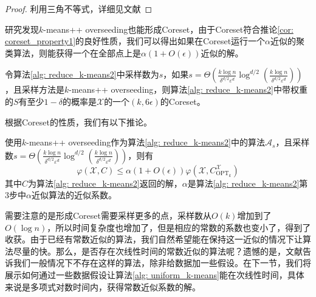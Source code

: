 \begin{proof}
    利用三角不等式，详细见文献\cite{aggarwal2009adaptive}
\end{proof}
研究发现$k$-means++ overseeding也能形成Coreset，由于Coreset符合推论\ref{cor: coreset_property1}的良好性质，我们可以得出如果在Coreset运行一个$\alpha$近似的聚类算法，则能获得一个在全部点上是$\alpha(1+O(\epsilon))$近似的解。
\begin{theorem}
    令算法\ref{alg: reduce_k-means2}中采样数为$s$，如果$s = \Theta\left(\frac{k \log n}{\delta^{d / 2} \varepsilon^{d}} \log ^{d / 2}\left(\frac{k \log n}{\delta^{d / 2} \varepsilon^{d}}\right)\right)$，且采样方法是$k$-means++ overseeding，则算法\ref{alg: reduce_k-means2}中带权重的$S$有至少$1-\delta$的概率是$\mathcal{X}$的一个$(k,6\epsilon)$的Coreset。
\end{theorem}
根据Coreset的性质，我们有以下推论。
\begin{corollary}
    使用$k$-means++ overseeding作为算法\ref{alg: reduce_k-means2}中的算法$\mathcal{A}_s$，且采样数$s = \Theta\left(\frac{k \log n}{\delta^{d / 2} \varepsilon^{d}} \log ^{d / 2}\left(\frac{k \log n}{\delta^{d / 2} \varepsilon^{d}}\right)\right)$，则有
    \begin{equation}
        \varphi(\mathcal{X},C) \leq \alpha(1+O(\epsilon)) \varphi(\mathcal{X},C_{\text{OPT}_k}^{\mathcal{X}})
    \end{equation}
    其中$C$为算法\ref{alg: reduce_k-means2}返回的解，$\alpha$是算法\ref{alg: reduce_k-means2}第3步中$\alpha$近似算法的近似系数。
\end{corollary}
需要注意的是形成Coreset需要采样更多的点，采样数从$O(k)$增加到了$O(\log n)$，所以时间复杂度也增加了，但是相应的常数的系数也变小了，得到了收获。由于已经有常数近似的算法，我们自然希望能在保持这一近似的情况下让算法尽量的快。那么，是否存在次线性时间的常数近似的算法呢？遗憾的是，文献\cite{mettu2004optimal}告诉我们一般情况下不存在这样的算法，除非给数据加一些假设。在下一节，我们将展示如何通过一些数据假设让算法\ref{alg: uniform_k-means}能在次线性时间，具体来说是多项式对数时间内，获得常数近似系数的解。